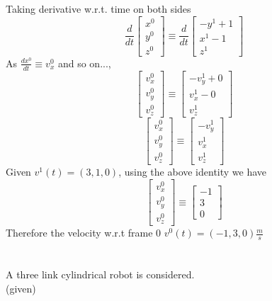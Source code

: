 \documentclass[12pt]{article}
\newcommand{\given}{{\\ \color{blue} \hspace*{\fill}(given)} \\}
\begin{document}
Taking derivative w.r.t. time on both sides
\[
  \frac{d}{dt}\begin{bmatrix} x^0 \\ y^0 \\ z^0\end{bmatrix} \equiv
  \frac{d}{dt}\begin{bmatrix} -y^1 + 1 \\ x^1 - 1 \\ z^1\end{bmatrix}
\]
As $\frac{dx^0}{dt} \equiv v_x^0$ and so on...,
\[
  \begin{bmatrix} v_x^0 \\ v_y^0 \\ v_z^0\end{bmatrix} \equiv
  \begin{bmatrix} -v_y^1 + 0 \\ v_x^1 - 0 \\ v_z^1\end{bmatrix}
\]
\[
  \begin{bmatrix} v_x^0 \\ v_y^0 \\ v_z^0\end{bmatrix} \equiv
  \begin{bmatrix} -v_y^1 \\ v_x^1 \\ v_z^1\end{bmatrix}
\]
Given $v^1(t) = (3, 1, 0)$, using the above identity we have
\[
  \begin{bmatrix} v_x^0 \\ v_y^0 \\ v_z^0\end{bmatrix} \equiv
  \begin{bmatrix} -1 \\ 3 \\ 0\end{bmatrix}
\]
Therefore the velocity w.r.t frame 0 $v^0(t) = (-1, 3, 0) \frac{m}{s}$

\pagebreak

\section{}
A three link cylindrical robot is considered.
\given
\end{document}

